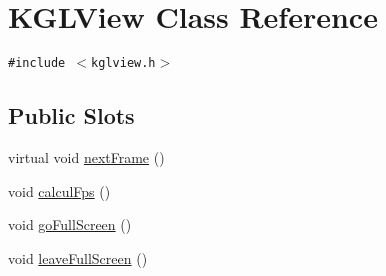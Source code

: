 \hypertarget{class_k_g_l_view}{
\section{KGLView Class Reference}
\label{class_k_g_l_view}
}
{\tt \#include $<$kglview.h$>$}

\subsection*{Public Slots}
\begin{CompactItemize}
\item 
virtual void \hyperlink{class_k_g_l_view_793fefddaec50bf299834893ea4a1f91}{nextFrame} ()
\item 
void \hyperlink{class_k_g_l_view_ca124634504e74e91e9d0a00c485c388}{calculFps} ()
\item 
void \hyperlink{class_k_g_l_view_14ed2a52d8843f27bef96b16d4b44c82}{goFullScreen} ()
\item 
void \hyperlink{class_k_g_l_view_996e019a804dcf51749ea900cc02cb83}{leaveFullScreen} ()
\end{CompactItemize}
